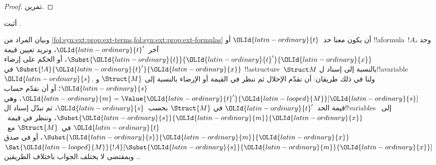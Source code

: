 \documentclass[../../../include/open-logic-section]{subfiles}
\begin{document}
\begin{proof}
تمرين.
\end{proof}

\begin{prob}
أثبت .
\end{prob}

\begin{explain}
  وبيان المراد من
  \cref{fol:syn:ext:prop:ext-terms,fol:syn:ext:prop:ext-formulas}
  أن يكون معنا حد~$\OLId{latin-ordinary}{t}$ أو !!a{formula}~$!A$، وحد آخر~$\OLId{latin-ordinary}{t}'$،
  ونريد تعيين قيمة $\Subst{\OLId{latin-ordinary}{t}}{\OLId{latin-ordinary}{t}'}{\OLId{latin-ordinary}{x}}$، أو الحكم على إرضاء
  $\Subst{!A}{\OLId{latin-ordinary}{t}'}{\OLId{latin-ordinary}{x}}$ في !!a{structure}~$\Struct M$
  بالنسبة إلى إسناد ل!!a{variable}~$\OLId{latin-ordinary}{s}$. ولنا في ذلك طريقان:
  أن نقدّم الإحلال ثم ننظر في القيمة أو الإرضاء بالنسبة إلى
  $\Struct{M}$ و$\OLId{latin-ordinary}{s}$؛ أو أن نقدّم حساب
  $\OLId{latin-ordinary}{m} = \Value{\OLId{latin-ordinary}{t}'}{\OLId{latin-looped}{M}}[\OLId{latin-ordinary}{s}]$، وهي قيمة الحد~$\OLId{latin-ordinary}{t}'$ في
  $\Struct{M}$ بحسب~$\OLId{latin-ordinary}{s}$، ثم نبدّل إسناد ال!!{variable}s
  إلى~$\Subst{\OLId{latin-ordinary}{s}}{\OLId{latin-ordinary}{m}}{\OLId{latin-ordinary}{x}}$، وننظر في قيمة~$\OLId{latin-ordinary}{t}$ في~$\Struct{M}$
  مع~$\Subst{\OLId{latin-ordinary}{s}}{\OLId{latin-ordinary}{m}}{\OLId{latin-ordinary}{x}}$، أو في صدق
  $\Sat{\OLId{latin-looped}{M}}{!A}[\Subst{\OLId{latin-ordinary}{s}}{\OLId{latin-ordinary}{m}}{\OLId{latin-ordinary}{x}}]$.
  وبمقتضى 
  لا يختلف الجواب باختلاف الطريقين.
\end{explain}
\end{document}
